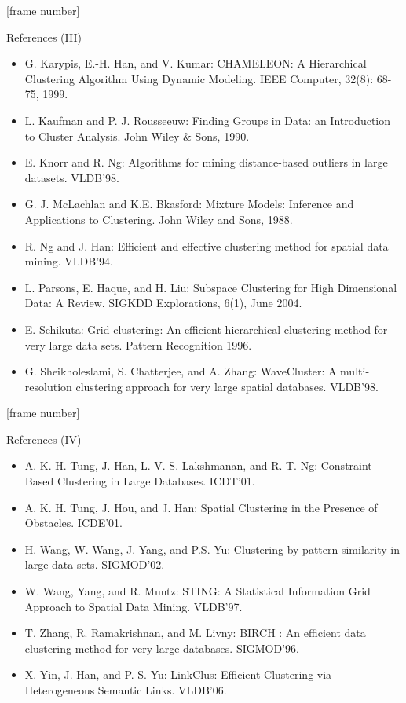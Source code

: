 \documentclass[aspectratio=169,t,xcolor=dvipsnames]{beamer}
\begin{document}
  {
    [frame number]
    \begin{frame}{References (III)}
        \begin{itemize}
          \item G. Karypis, E.-H. Han, and V. Kumar: CHAMELEON: A Hierarchical Clustering Algorithm Using Dynamic Modeling. IEEE Computer, 32(8): 68-75, 1999.
          \item L. Kaufman and P. J. Rousseeuw: Finding Groups in Data: an Introduction to Cluster Analysis. John Wiley \& Sons, 1990.
          \item E. Knorr and R. Ng: Algorithms for mining distance-based outliers in large datasets. VLDB'98.
          \item G. J. McLachlan and K.E. Bkasford: Mixture Models: Inference and Applications to Clustering. John Wiley and Sons, 1988.
          \item R. Ng and J. Han: Efficient and effective clustering method for spatial data mining. VLDB'94.
          \item L. Parsons, E. Haque, and H. Liu: Subspace Clustering for High Dimensional Data: A Review. SIGKDD Explorations, 6(1), June 2004.
          \item E. Schikuta: Grid clustering: An efficient hierarchical clustering method for very large data sets. Pattern Recognition 1996.
          \item G. Sheikholeslami, S. Chatterjee, and A. Zhang: WaveCluster: A multi-resolution clustering approach for very large spatial databases. VLDB'98.
        \end{itemize}
    \end{frame}
  }

  {
    [frame number]
    \begin{frame}{References (IV)}
        \begin{itemize}
          \item A. K. H. Tung, J. Han, L. V. S. Lakshmanan, and R. T. Ng: Constraint-Based Clustering in Large Databases. ICDT'01.
          \item A. K. H. Tung, J. Hou, and J. Han: Spatial Clustering in the Presence of Obstacles. ICDE'01.
          \item H. Wang, W. Wang, J. Yang, and P.S. Yu: Clustering by pattern similarity in large data sets. SIGMOD'02.
          \item W. Wang, Yang, and R. Muntz: STING: A Statistical Information Grid Approach to Spatial Data Mining. VLDB'97.
          \item T. Zhang, R. Ramakrishnan, and M. Livny: BIRCH : An efficient data clustering method for very large databases. SIGMOD'96.
          \item X. Yin, J. Han, and P. S. Yu: LinkClus: Efficient Clustering via Heterogeneous Semantic Links. VLDB'06.
        \end{itemize}
    \end{frame}
  }
\end{document}
